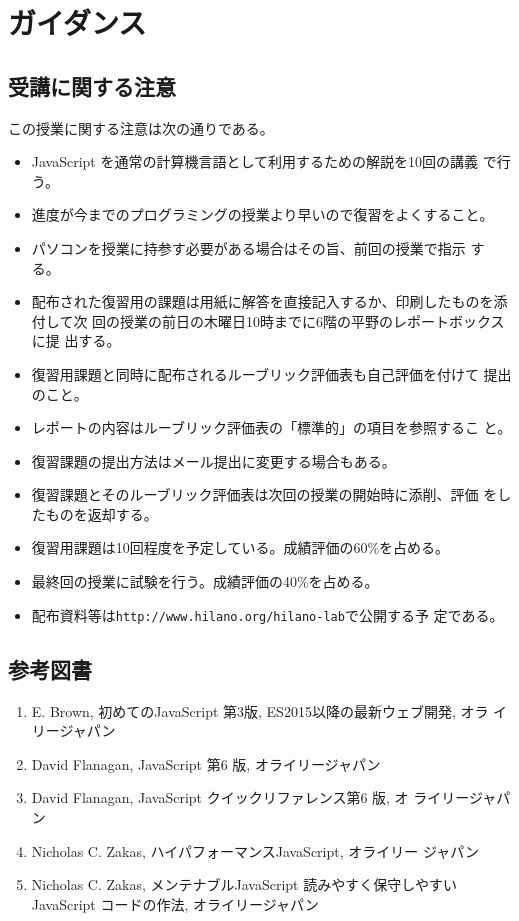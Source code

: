 \chapter{ガイダンス}
\section{受講に関する注意}
この授業に関する注意は次の通りである。
\begin{itemize}
 \item JavaScript を通常の計算機言語として利用するための解説を10回の講義
       で行う。
 \item 進度が今までのプログラミングの授業より早いので復習をよくすること。
 \item パソコンを授業に持参す必要がある場合はその旨、前回の授業で指示
       する。
  \item 配布された復習用の課題は用紙に解答を直接記入するか、印刷したものを添付して次
        回の授業の前日の木曜日10時までに6階の平野のレポートボックスに提
        出する。
 \item 復習用課題と同時に配布されるルーブリック評価表も自己評価を付けて
       提出のこと。
 \item レポートの内容はルーブリック評価表の「標準的」の項目を参照するこ
       と。
 \item 復習課題の提出方法はメール提出に変更する場合もある。
 \item 復習課題とそのルーブリック評価表は次回の授業の開始時に添削、評価
       をしたものを返却する。
 \item 復習用課題は10回程度を予定している。成績評価の60\%を占める。
\item 最終回の授業に試験を行う。成績評価の40\%を占める。
 \item 配布資料等は\texttt{http://www.hilano.org/hilano-lab}で公開する予
       定である。
\end{itemize}
\section{参考図書}

\begin{enumerate}
 \item E. Brown, 初めてのJavaScript 第3版, ES2015以降の最新ウェブ開発, オラ
       イリージャパン\label{ES2016}
 \item David Flanagan, JavaScript 第6 版, オライリージャパン\label{JS6}
 \item David Flanagan, JavaScript クイックリファレンス第6 版, オ\label{JS6ref}
	 ライリージャパン
 \item Nicholas C. Zakas, ハイパフォーマンスJavaScript, オライリー
	 ジャパン\label{JSPerformance}
 \item Nicholas C. Zakas, メンテナブルJavaScript 読みやすく保守しやすいJavaScript 
コードの作法, オライリージャパン
\end{enumerate}
